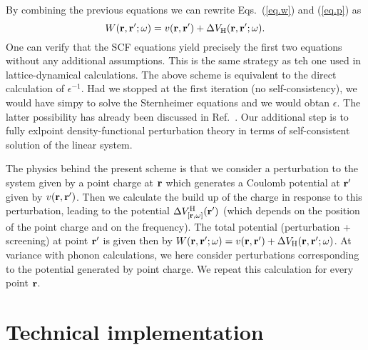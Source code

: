 \documentclass[twocolumn,prb,showpacs,superscriptaddress]{revtex4}
\def\w{\omega}
\def\r{{\bf r}}
\def\rp{{\bf r^\prime}}
\begin{document}
By combining the previous equations we can rewrite Eqs.\ (\ref{eq.w}) and (\ref{eq.p}) as
  \begin{equation}
  W(\r,\rp;\w) = v(\r,\rp) + \Delta V_{\rm H}(\r,\rp;\w).
  \end{equation}
One can verify that the SCF equations yield precisely the first two equations
without any additional assumptions. This is the same strategy as teh one used
in lattice-dynamical calculations.
The above scheme is equivalent to the direct calculation of $\epsilon^{-1}$.
Had we stopped at the first iteration (no self-consistency), we would have
simpy to solve the Sternheimer equations and we would obtan $\epsilon$.
The latter possibility has already been discussed in Ref.\ .
Our additional step is to fully exlpoint density-functional perturbation theory
in terms of self-consistent solution of the linear system.

The physics behind the present scheme is that we consider a perturbation to
the system given by a point charge at $\r$ which generates a Coulomb potential
at $\rp$ given by $v(\r,\rp)$. Then we calculate the build up of the charge
in response to this perturbation, leading to the potential $\Delta V^{\rm H}_{[\r,\w]}(\rp)$
(which depends on the position of the point charge and on the frequency).
The total potential (perturbation + screening) at point $\rp$ is given then
by $W(\r,\rp;\w) = v(\r,\rp) + \Delta V_{\rm H}(\r,\rp;\w)$.
At variance with phonon calculations, we here consider perturbations corresponding
to the potential generated by point charge. We repeat this calculation for
every point $\r$.

\section{Technical implementation}
\end{document}
